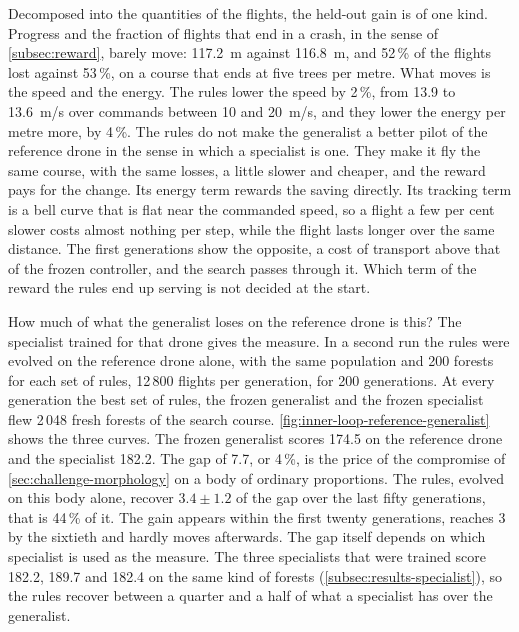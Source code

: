 Decomposed into the quantities of the flights, the held-out gain is of one kind. Progress and the fraction of flights that end in a crash, in the sense of \autoref{subsec:reward}, barely move: 117.2~m against 116.8~m, and 52\,\% of the flights lost against 53\,\%, on a course that ends at five trees per metre. What moves is the speed and the energy. The rules lower the speed by 2\,\%, from 13.9 to 13.6~m/s over commands between 10 and 20~m/s, and they lower the energy per metre more, by 4\,\%. The rules do not make the generalist a better pilot of the reference drone in the sense in which a specialist is one. They make it fly the same course, with the same losses, a little slower and cheaper, and the reward pays for the change. Its energy term rewards the saving directly. Its tracking term is a bell curve that is flat near the commanded speed, so a flight a few per cent slower costs almost nothing per step, while the flight lasts longer over the same distance. The first generations show the opposite, a cost of transport above that of the frozen controller, and the search passes through it. Which term of the reward the rules end up serving is not decided at the start.

How much of what the generalist loses on the reference drone is this? The specialist trained for that drone gives the measure. In a second run the rules were evolved on the reference drone alone, with the same population and 200 forests for each set of rules, 12\,800 flights per generation, for 200 generations. At every generation the best set of rules, the frozen generalist and the frozen specialist flew 2\,048 fresh forests of the search course. \autoref{fig:inner-loop-reference-generalist} shows the three curves. The frozen generalist scores 174.5 on the reference drone and the specialist 182.2. The gap of 7.7, or 4\,\%, is the price of the compromise of \autoref{sec:challenge-morphology} on a body of ordinary proportions. The rules, evolved on this body alone, recover $3.4 \pm 1.2$ of the gap over the last fifty generations, that is 44\,\% of it. The gain appears within the first twenty generations, reaches 3 by the sixtieth and hardly moves afterwards. The gap itself depends on which specialist is used as the measure. The three specialists that were trained score 182.2, 189.7 and 182.4 on the same kind of forests (\autoref{subsec:results-specialist}), so the rules recover between a quarter and a half of what a specialist has over the generalist.

